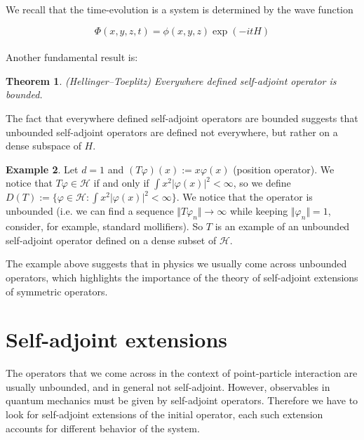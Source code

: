 \documentclass[11pt, a4paper, german]{article}
\theoremstyle{plain}
\newtheorem{theorem}{Theorem}
\theoremstyle{definition}
\newtheorem{example}[theorem]{Example}
\theoremstyle{remark}
\numberwithin{equation}{section}
\numberwithin{theorem}{section}
\begin{document}
We recall that the time-evolution is a system is determined by the wave function 

\begin{equation}
\Phi(x,y,z,t) = \phi(x,y,z)\exp(-itH)
\end{equation}\\

Another fundamental result is:

\begin{theorem} (Hellinger--Toeplitz)
Everywhere defined self-adjoint operator is bounded.
\end{theorem}

The fact that everywhere defined self-adjoint operators are bounded suggests that unbounded self-adjoint operators are defined not everywhere, but rather on a dense subspace of $H$.

\begin{example}

Let $d=1$ and $(T \varphi)(x) := x \varphi (x)$ (position operator). We notice that $T \varphi \in \mathcal{H}$ if and only if $\int x^2 |\varphi(x)|^2 < \infty$, so we define $D(T):= \{\varphi \in \mathcal{H} :\int x^2 |\varphi(x)|^2 < \infty \}$. We notice that the operator is unbounded (i.e. we can find a sequence $\Vert T \varphi_n \Vert \rightarrow \infty$ while keeping $\Vert \varphi_n \Vert = 1$, consider, for example, standard mollifiers). So $T$ is an example of an unbounded self-adjoint operator defined on a dense subset of $\mathcal{H}$.

\end{example}

The example above suggests that in physics we usually come across unbounded operators, which highlights the importance of the theory of self-adjoint extensions of symmetric operators.

\section{Self-adjoint extensions}\label{sec:self-adjoint-extensions}

The operators that we come across in the context of point-particle interaction are usually unbounded, and in general not self-adjoint. However, observables in quantum mechanics must be given by self-adjoint operators. Therefore we have to look for self-adjoint extensions of the initial operator, each such extension accounts for different behavior of the system.\\
\end{document}
